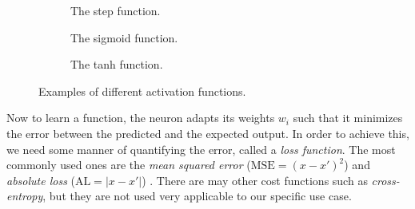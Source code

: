 \begin{figure}[ht]
  \begin{subfigure}[b]{0.32\textwidth}
    \centering
    \caption{The step function.}
  \end{subfigure}
  \begin{subfigure}[b]{0.32\textwidth}
    \centering
    \caption{The sigmoid function.}
  \end{subfigure}
  \begin{subfigure}[b]{0.32\textwidth}
    \centering
    \caption{The tanh function.}
  \end{subfigure}
  \caption{Examples of different activation functions.}

\label{fig:activation-functions}
\end{figure}

Now to learn a function, the neuron adapts its weights $w_i$ such that it minimizes the error between the predicted and the expected output.
In order to achieve this, we need some manner of quantifying the error, called a \textit{loss function}.
The most commonly used ones are the \textit{mean squared error} ($\text{MSE} = (x - x')^2$) and \textit{absolute loss} ($\text{AL} = | x - x' |$) \cite{nielsen_2017}.
There are may other cost functions such as \textit{cross-entropy}, but they are not used very applicable to our specific use case.

